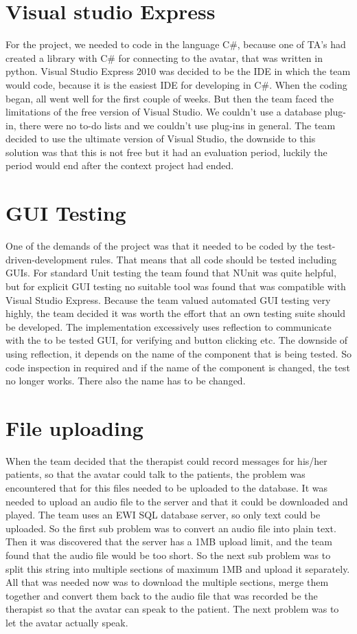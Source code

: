 \section{Visual studio Express}
For the project, we needed to code in the language C\#, because one of TA's had created a library with C\# for connecting to the avatar, that was written in python. Visual Studio Express 2010 was decided to be the IDE in which the team would code, because it is the easiest IDE for developing in C\#. When the coding began, all went well for the first couple of weeks. But then the team faced the limitations of the free version of Visual Studio. We couldn't use a database plug-in, there were no to-do lists and we couldn't use plug-ins in general. The team decided to use the ultimate version of Visual Studio, the downside to this solution was that this is not free but it had an evaluation period, luckily the period would end after the context project had ended.
\section{GUI Testing}
One of the demands of the project was that it needed to be coded by the test-driven-development rules. That means that all code should be tested including GUIs. For standard Unit testing the team found that NUnit was quite helpful, but for explicit GUI testing no suitable tool was found that was compatible with Visual Studio Express. Because the team valued automated GUI testing very highly, the team decided it was worth the effort that an own testing suite should be developed. The implementation excessively uses reflection to communicate with the to be tested GUI, for verifying and button clicking etc. The downside of using reflection, it depends on the name of the component that is being tested. So code inspection in required and if the name of the component is changed, the test no longer works. There also the name has to be changed.
\section{File uploading}
When the team decided that the therapist could record messages for his/her patients, so that the avatar could talk to the patients, the problem was encountered that for this files needed to be uploaded to the database. It was needed to upload an audio file to the server and that it could be downloaded and played. The team uses an EWI SQL database server, so only text could be uploaded. So the first sub problem was to convert an audio file into plain text. Then it was discovered that the server has a 1MB upload limit, and the team found that the audio file would be too short. So the next sub problem was to split this string into multiple sections of maximum 1MB and upload it separately. All that was needed now was to download the multiple sections, merge them together and convert them back to the audio file that was recorded be the therapist so that the avatar can speak to the patient. The next problem was to let the avatar actually speak.
